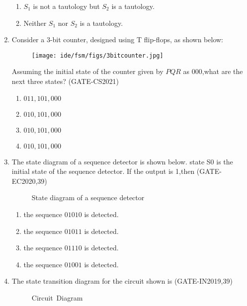 \begin{enumerate}
\begin{enumerate}[label=(\Alph*)]
			\item $S_1$ is not a tautology but $S_2$ is a tautology.
			\item Neither $S_1$ nor $S_2$ is a tautology.
		\end{enumerate}
\item Consider a $3$-bit counter, designed using T flip-flops, as shown below:
     \begin{figure}[H]
\centering
\texttt{[image: ide/fsm/figs/3bitcounter.jpg]}
\caption{}
\label{fig:3bitcounter.jpg}
\end{figure}
Assuming the initial state of the counter given by $PQR$ as $000$,what are the next three states?
                 \hfill(GATE-CS2021)
\begin{enumerate}[label=(\Alph*)]
\item $011, 101, 000$
\item $010, 101, 000$
\item $010, 101, 000$
\item $010, 101, 000$
\end{enumerate}

\item The state diagram of a sequence detector is shown below. state S0 is the initial state of the sequence detector. If the output is 1,then
                                        \hfill(GATE-EC2020,39)
\begin{figure}[H]
    \centering
    
    \caption{State diagram of a sequence detector}
    	
\end{figure}
\begin{enumerate}
\item   the sequence $01010$ is detected.
\item   the sequence $01011$ is detected.
\item   the sequence $01110$ is detected.
\item   the sequence $01001$ is detected.
\end{enumerate}


\item The state transition diagram for the circuit shown is
                         \hfill(GATE-IN2019,39)
\begin{figure}[H]
\centering

\caption{Circuit~Diagram}
\end{figure}


\end{enumerate}
